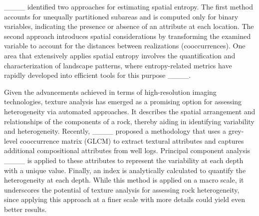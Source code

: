 ____ identified two approaches for estimating spatial entropy. The first method accounts for unequally partitioned subareas and is computed only for binary variables, indicating the presence or absence of an attribute at each location. The second approach introduces spatial considerations by transforming the examined variable to account for the distances between realizations (cooccurrences). One area that extensively applies spatial entropy involves the quantification and characterization of landscape patterns, where entropy-related metrics have rapidly developed into efficient tools for this purpose ____.

Given the advancements achieved in terms of high-resolution imaging technologies, texture analysis has emerged as a promising option for assessing heterogeneity via automated approaches. It describes the spatial arrangement and relationships of the components of a rock, thereby aiding in identifying variability and heterogeneity. Recently, ____ proposed a methodology that uses a grey-level cooccurrence matrix (GLCM) to extract textural attributes and captures additional compositional attributes from well logs. Principal component analysis ____ is applied to these attributes to represent the variability at each depth with a unique value. Finally, an index is analytically calculated to quantify the heterogeneity at each depth. While this method is applied on a macro scale, it underscores the potential of texture analysis for assessing rock heterogeneity, since applying this approach at a finer scale with more details could yield even better results.